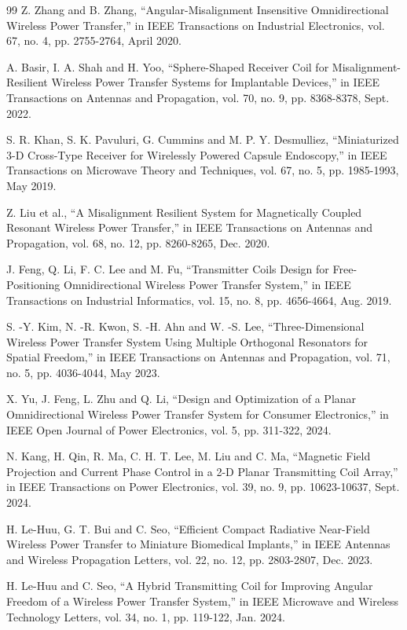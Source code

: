 \documentclass[journal]{IEEEtran}
\begin{document}
\begin{thebibliography}{99}
 Z. Zhang and B. Zhang, ``Angular-Misalignment Insensitive Omnidirectional Wireless Power Transfer,'' in IEEE Transactions on Industrial Electronics, vol. 67, no. 4, pp. 2755-2764, April 2020.


 A. Basir, I. A. Shah and H. Yoo, ``Sphere-Shaped Receiver Coil for Misalignment-Resilient Wireless Power Transfer Systems for Implantable Devices,'' in IEEE Transactions on Antennas and Propagation, vol. 70, no. 9, pp. 8368-8378, Sept. 2022.


 S. R. Khan, S. K. Pavuluri, G. Cummins and M. P. Y. Desmulliez, ``Miniaturized 3-D Cross-Type Receiver for Wirelessly Powered Capsule Endoscopy,'' in IEEE Transactions on Microwave Theory and Techniques, vol. 67, no. 5, pp. 1985-1993, May 2019.


 Z. Liu et al., ``A Misalignment Resilient System for Magnetically Coupled Resonant Wireless Power Transfer,'' in IEEE Transactions on Antennas and Propagation, vol. 68, no. 12, pp. 8260-8265, Dec. 2020.


 J. Feng, Q. Li, F. C. Lee and M. Fu, ``Transmitter Coils Design for Free-Positioning Omnidirectional Wireless Power Transfer System,'' in IEEE Transactions on Industrial Informatics, vol. 15, no. 8, pp. 4656-4664, Aug. 2019.

S. -Y. Kim, N. -R. Kwon, S. -H. Ahn and W. -S. Lee, ``Three-Dimensional Wireless Power Transfer System Using Multiple Orthogonal Resonators for Spatial Freedom,'' in IEEE Transactions on Antennas and Propagation, vol. 71, no. 5, pp. 4036-4044, May 2023.

X. Yu, J. Feng, L. Zhu and Q. Li, ``Design and Optimization of a Planar Omnidirectional Wireless Power Transfer System for Consumer Electronics,'' in IEEE Open Journal of Power Electronics, vol. 5, pp. 311-322, 2024.

N. Kang, H. Qin, R. Ma, C. H. T. Lee, M. Liu and C. Ma, ``Magnetic Field Projection and Current Phase Control in a 2-D Planar Transmitting Coil Array,'' in IEEE Transactions on Power Electronics, vol. 39, no. 9, pp. 10623-10637, Sept. 2024.

H. Le-Huu, G. T. Bui and C. Seo, ``Efficient Compact Radiative Near-Field Wireless Power Transfer to Miniature Biomedical Implants,'' in IEEE Antennas and Wireless Propagation Letters, vol. 22, no. 12, pp. 2803-2807, Dec. 2023.

H. Le-Huu and C. Seo, ``A Hybrid Transmitting Coil for Improving Angular Freedom of a Wireless Power Transfer System,'' in IEEE Microwave and Wireless Technology Letters, vol. 34, no. 1, pp. 119-122, Jan. 2024.



\end{thebibliography}
\end{document}

